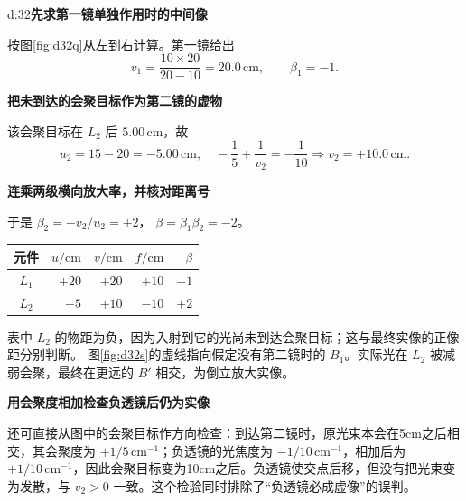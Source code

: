 \begin{drillsolution}{d:32}\textbf{先求第一镜单独作用时的中间像}\par\nobreak
按图\ref{fig:d32q}从左到右计算。第一镜给出
\[
 v_1=\frac{10\times20}{20-10}=20.0\,\mathrm{cm},\qquad\beta_1=-1.
\]



\par\medskip{}\noindent\textbf{把未到达的会聚目标作为第二镜的虚物}\par\nobreak
该会聚目标在 \(L_2\) 后 \(5.00\,\mathrm{cm}\)，故
\[
 u_2=15-20=-5.00\,\mathrm{cm},\quad
 -\frac15+\frac1{v_2}=-\frac1{10}
 \Rightarrow\boxed{v_2=+10.0\,\mathrm{cm}}.
\]


\par\medskip{}\noindent\textbf{连乘两级横向放大率，并核对距离号}\par\nobreak
于是 \(\beta_2=-v_2/u_2=+2\)，
\(\boxed{\beta=\beta_1\beta_2=-2}\)。
\begin{center}\begin{tabular}{c|rrrr}
元件&\(u/\mathrm{cm}\)&\(v/\mathrm{cm}\)&\(f/\mathrm{cm}\)&\(\beta\)\\\hline
\(L_1\)&\(+20\)&\(+20\)&\(+10\)&\(-1\)\\
\(L_2\)&\(-5\)&\(+10\)&\(-10\)&\(+2\)
\end{tabular}\end{center}
表中 \(L_2\) 的物距为负，因为入射到它的光尚未到达会聚目标；这与最终实像的正像距分别判断。
图\ref{fig:d32s}的虚线指向假定没有第二镜时的 \(B_1\)。实际光在 \(L_2\) 被减弱会聚，最终在更远的 \(B'\) 相交，为倒立放大实像。



\par\medskip{}\noindent\textbf{用会聚度相加检查负透镜后仍为实像}\par\nobreak
还可直接从图中的会聚目标作方向检查：到达第二镜时，原光束本会在5cm之后相交，其会聚度为 \(+1/5\,\mathrm{cm}^{-1}\)；负透镜的光焦度为 \(-1/10\,\mathrm{cm}^{-1}\)，相加后为 \(+1/10\,\mathrm{cm}^{-1}\)，因此会聚目标变为10cm之后。负透镜使交点后移，但没有把光束变为发散，与 \(v_2>0\) 一致。这个检验同时排除了“负透镜必成虚像”的误判。


\end{drillsolution}

